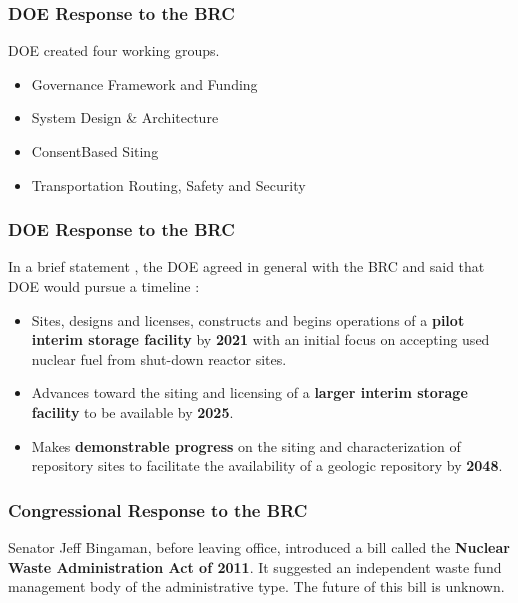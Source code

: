 \begin{frame}[ctb!]
    \frametitle{DOE Response to the BRC}

    DOE created four working groups. 
    \begin{itemize}
      \item Governance Framework and Funding
      \item System Design \& Architecture
      \item ConsentBased Siting
      \item Transportation Routing, Safety and Security
    \end{itemize}
  \end{frame}

\begin{frame}[ctb!]
    \frametitle{DOE Response to the BRC}
    \footnotesize{
    In a brief statement \cite{doe_strategy_2013}, the DOE agreed in general 
    with the BRC and said that DOE would pursue a timeline :

    \begin{itemize}
      \item Sites, designs and licenses, constructs and begins operations of a 
        \textbf{pilot interim storage facility} by \textbf{2021} with an initial 
        focus on accepting used nuclear fuel from shut-down reactor sites.
      \item Advances toward the siting and licensing of a \textbf{larger interim 
        storage facility} to be available by \textbf{2025}.
      \item Makes \textbf{demonstrable progress} on the siting and characterization of 
        repository sites to facilitate the availability of a geologic repository 
        by \textbf{2048}.
    \end{itemize}
  }
  \end{frame}

\begin{frame}[ctb!]
    \frametitle{Congressional Response to the BRC}
    Senator Jeff Bingaman, before leaving office, introduced a bill called the 
    \textbf{Nuclear Waste Administration Act of 2011}. It suggested an independent waste fund management body of the administrative type.  The future of this bill is unknown.  
  \end{frame}

